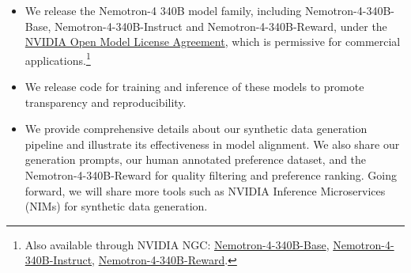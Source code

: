 \documentclass[11pt]{article}
\newcommand{\ours}{Nemotron-4-340B-Base}
\newcommand{\oursin}{Nemotron-4-340B-Instruct}
\newcommand{\oursrm}{Nemotron-4-340B-Reward}
\begin{document}
\begin{itemize}
    \item We release the Nemotron-4 340B model family, including \ours{}, \oursin{} and \oursrm{},  under the \href{https://developer.download.nvidia.com/licenses/nvidia-open-model-license-agreement-june-2024.pdf}{NVIDIA Open Model License Agreement}, which is permissive for commercial applications.\footnote{Also available through NVIDIA NGC: \href{https://catalog.ngc.nvidia.com/orgs/nvidia/teams/nemo/models/nemotron-4-340b-base}{\ours{}}, \href{https://catalog.ngc.nvidia.com/orgs/nvidia/teams/nemo/models/nemotron-4-340b-instruct}{\oursin{}}, \href{https://catalog.ngc.nvidia.com/orgs/nvidia/teams/nemo/models/nemotron-4-340b-reward}{\oursrm{}}.}
    \item We release code for training and inference of these models to promote transparency and reproducibility.
    \item We provide comprehensive details about our synthetic data generation pipeline and illustrate its effectiveness in model alignment. We also share our generation prompts, our human annotated preference dataset, and  the \oursrm{} for quality filtering and preference ranking. Going forward, we will share more tools such as NVIDIA Inference Microservices (NIMs) for synthetic data generation.
\end{itemize}

% 
% 

\end{document}
